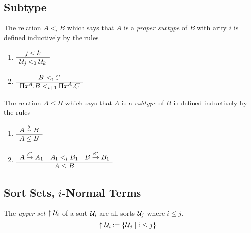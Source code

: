 \subsection{Subtype}



\begin{definition}
    \label{def:ProperSubtype}
    The relation $A <_i B$ which says that $A$ is a \emph{proper subtype} of $B$
    with arity $i$ is defined inductively by the rules
    \begin{enumerate}
        \item $\begin{array}{c} j < k \\ \hline {\cal U}_j <_0 {\cal U}_k\end{array}$

        \item $\begin{array}{c} B <_i C \\ \hline \Pi x^A. B <_{i+1} \Pi x^A. C\end{array}$
    \end{enumerate}
\end{definition}



\begin{definition}
    \label{def:Subtype}
    The relation $A \le B$ which says that $A$ is a \emph{subtype} of $B$ is
    defined inductively by the rules
    \begin{enumerate}
        \item $\begin{array}{c} A \stackrel{\beta}{\sim} B \\ \hline A \le B\end{array}$

        \item $
            \begin{array}{c} A \stackrel{\beta^*}{\to} A_1\quad A_1 <_i B_1\quad B \stackrel{\beta^*}{\to} B_1 \\ \hline A \le B\end{array}
            $
    \end{enumerate}
\end{definition}








\subsection{Sort Sets, $i$-Normal Terms}


\begin{definition}
    \label{def:UpperSet}
    The \emph{upper set} ${\uparrow {\cal U}_i}$ of a sort ${\cal U}_i$ are all sorts
    ${\cal U}_j$ where $i \le j$.
    $$
    {\uparrow {\cal U}_i} := {\left\{{\cal U}_j \mid i \le j\right\}}
    $$
\end{definition}




